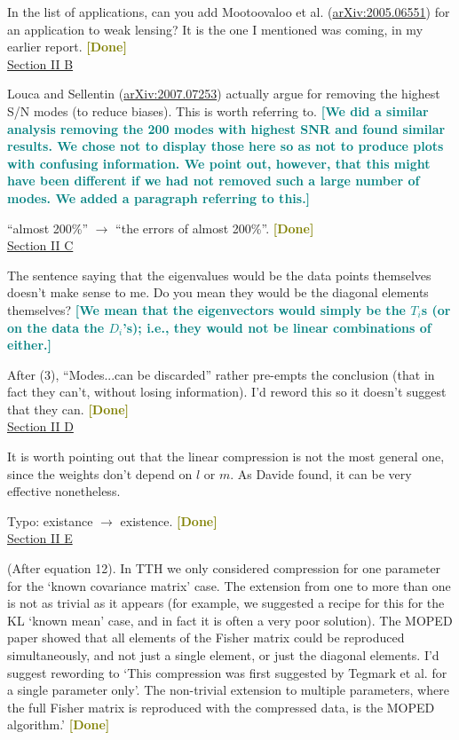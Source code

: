 \documentclass{article}
\newcommand\reply[1]{{\bf {\textcolor{teal}{[#1]}}}}
\newcommand\done{{\bf {\textcolor{olive}{[Done]}}}}
\begin{document}
    In the list of applications, can you add Mootoovaloo et al. (\href{https://arxiv.org/pdf/2005.06551.pdf}{arXiv:2005.06551}) for an application to weak lensing?  It is the one I mentioned was coming, in my earlier report. \done\\

    \underline{Section II B}
    
    Louca and Sellentin (\href{https://arxiv.org/pdf/2007.07253.pdf}{arXiv:2007.07253}) actually argue for removing the highest S/N modes (to reduce biases).  This is worth referring to. \reply{We did a similar analysis removing the 200 modes with highest SNR and found similar results. We chose not to display those here so as not to produce plots with confusing information. We point out, however, that this might have been different if we had not removed such a large number of modes. We added a paragraph referring to this.}

    “almost 200\%” $\rightarrow$ “the errors of almost 200\%”. \done\\

    \underline{Section II C}
    
    The sentence saying that the eigenvalues would be the data points themselves doesn’t make sense to me.  Do you mean they would be the diagonal elements themselves? \reply{We mean that the eigenvectors would simply be the $T_i$s (or on the data the $D_i$’s); i.e., they would not be linear combinations of either.}

    After (3), “Modes...can be discarded” rather pre-empts the conclusion (that in fact they can’t, without losing information).  I’d reword this so it doesn’t suggest that they can. \done\\

    \underline{Section II D}
    
    It is worth pointing out that the linear compression is not the most general one, since the weights don’t depend on $l$ or $m$.  As Davide found, it can be very effective nonetheless.

    Typo: existance $\rightarrow$ existence. \done\\

    \underline{Section II E}
    
    (After equation 12). In TTH we only considered compression for one parameter for the ‘known covariance matrix’ case.  The extension from one to more than one is not as trivial as it appears (for example, we suggested a recipe for this for the KL ‘known mean’ case, and in fact it is often a very poor solution).  The MOPED paper showed that all elements of the Fisher matrix could be reproduced simultaneously, and not just a single element, or just the diagonal elements.  I’d suggest rewording to ‘This compression was first suggested by Tegmark et al. for a single parameter only’.  The non-trivial extension to multiple parameters, where the full Fisher matrix is reproduced with the compressed data, is the MOPED algorithm.’ \done\\
    
\end{document}
